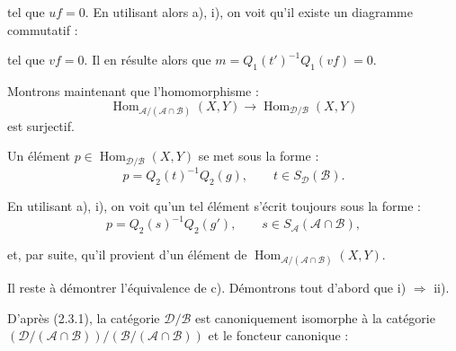 \clearpage
{}%
\begingroup
\small
\setlength{\parskip}{0pt}%
\setlength{\emergencystretch}{1.5em}%
\setlength{\abovedisplayskip}{3pt plus 1pt minus 1pt}%
\setlength{\belowdisplayskip}{3pt plus 1pt minus 1pt}%

\noindent tel que $uf=0$. En utilisant alors a), i), on voit qu'il existe
un diagramme commutatif :

\begin{center}
\end{center}

\noindent tel que $vf=0$. Il en résulte alors que
$m=Q_1(t')^{-1}Q_1(vf)=0$.

Montrons maintenant que l'homomorphisme :
\[
  \operatorname{Hom}_{\mathcal A/(\mathcal A\cap\mathcal B)}(X,Y)
  \longrightarrow
  \operatorname{Hom}_{\mathcal D/\mathcal B}(X,Y)
\]
est surjectif.

Un élément $p\in\operatorname{Hom}_{\mathcal D/\mathcal B}(X,Y)$ se met
sous la forme :
\[
  p=Q_2(t)^{-1}Q_2(g),\qquad t\in S_{\mathcal D}(\mathcal B).
\]

En utilisant a), i), on voit qu'un tel élément s'écrit toujours sous la
forme :
\[
  p=Q_2(s)^{-1}Q_2(g'),\qquad
  s\in S_{\mathcal A}(\mathcal A\cap\mathcal B),
\]

\noindent et, par suite, qu'il provient d'un élément de
$\operatorname{Hom}_{\mathcal A/(\mathcal A\cap\mathcal B)}(X,Y)$.

Il reste à démontrer l'équivalence de c). Démontrons tout d'abord que i)
$\Rightarrow$ ii).

D'après (2.3.1), la catégorie $\mathcal D/\mathcal B$ est canoniquement
isomorphe à la catégorie
$(\mathcal D/(\mathcal A\cap\mathcal B))
/(\mathcal B/(\mathcal A\cap\mathcal B))$ et le foncteur canonique :

